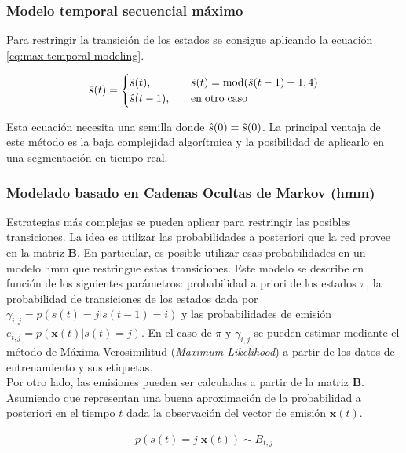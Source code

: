 \subsubsection*{Modelo temporal secuencial máximo}

\indent Para restringir la transición de los estados se consigue aplicando la ecuación \ref{eq:max-temporal-modeling}.

\begin{align} \label{eq:max-temporal-modeling}
  \hat{s}(t) =
  \begin{cases}
    \Tilde{s}(t), \quad &\Tilde{s}(t) = \mathrm{mod}(\hat{s}(t-1)+1, 4)\\
    \hat{s}(t-1), \quad &\mathrm{en\;otro\;caso}
  \end{cases}
\end{align}

\indent Esta ecuación necesita una semilla donde $\hat{s}(0) = \Tilde{s}(0)$. La principal ventaja de este método es
la baja complejidad algorítmica y la posibilidad de aplicarlo en una segmentación en tiempo real.

\subsubsection*{Modelado basado en Cadenas Ocultas de Markov (\acrshort{hmm})}

\indent Estrategias más complejas se pueden aplicar para restringir las posibles transiciones. La idea es utilizar
las probabilidades a posteriori que la red provee en la matriz $\mathbf{B}$. En particular, es posible utilizar esas
probabilidades en un modelo \acrshort{hmm} que restringue estas transiciones. Este modelo se describe en función de
los siguientes parámetros: probabilidad a priori de los estados $\pi$, la probabilidad de transiciones de los
estados dada por $\gamma_{i,j} = p(s(t)=j|s(t-1)=i)$ y las probabilidades de emisión $e_{t,j} = p(\mathbf{x}(t)|s(t)
= j)$. En el caso de $\pi$ y $\gamma_{i,j}$ se pueden estimar mediante el método de Máxima Verosimilitud
(\textit{Maximum Likelihood}) a partir de los datos de entrenamiento y sus etiquetas. \\
\indent Por otro lado, las emisiones pueden ser calculadas a partir de la matriz $\mathbf{B}$. Asumiendo que
representan una buena aproximación de la probabilidad a posteriori en el tiempo $t$ dada la observación del vector
de emisión $\mathbf{x}(t)$.

\begin{align}
  p(s(t) = j | \mathbf{x}(t)) \sim B_{t,j}
\end{align}

